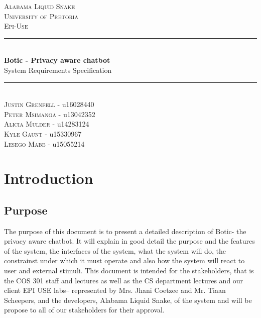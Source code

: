 \documentclass[11pt]{article}
\begin{document}
 \renewcommand{\familydefault}{\sfdefault}
\begin{titlepage}
	\newcommand{\HRule}{\rule{\linewidth}{0.5mm}}
    \begin{center}
            
    	\textsc{\LARGE Alabama Liquid Snake}\\[0.8cm]
    	\textsc{\Large University of Pretoria}\\[0.5cm]
    	\textsc{\large Epi-Use}\\[0.5cm]
    
    	\HRule\\[0.4cm]
    	
    	{\huge\bfseries Botic - Privacy aware chatbot}\\[0.2cm]
    	
    	{\huge System Requirements Specification}\\[0.2cm]

    	\HRule\\[0.5cm]

	    \textsc{Justin Grenfell} - u16028440 \\[0cm]
	    \textsc{Peter Msimanga} - u13042352 \\[0cm]
	    \textsc{Alicia Mulder} - u14283124 \\[0cm]
	    \textsc{Kyle Gaunt} - u15330967 \\[0cm]
	    \textsc{Lesego Mabe} - u15055214 \\[0cm]
    
    \end{center}
\end{titlepage}
\tableofcontents
\newpage
\section{Introduction}
\subsection{Purpose}
The purpose of this document is to present a detailed description of Botic- the privacy aware chatbot. It will explain in good detail the purpose and the features of the system, the interfaces of the system, what the system will do, the constrainst under which it must operate and also how the system will react to user and external stimuli. This document is intended for the stakeholders, that is the COS 301 staff and lectures as well as the CS department lectures and our client EPI USE labs-- represented by Mrs. Jhani Coetzee and Mr. Tiaan Scheepers, and the developers, Alabama Liquid Snake, of the system and will be propose to all of our stakeholders for their approval.
\end{document}
